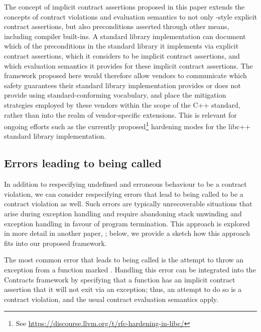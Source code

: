 The concept of implicit contract assertions proposed in this paper extends the concepts of contract violations and evaluation semantics to not only \cite{P2900R7}-style explicit contract assertions, but also preconditions asserted through other means, including compiler built-ins. A standard library implementation can document which of the preconditions in the standard library it implements via explicit contract assertions, which it considers to be implicit contract assertions, and which evaluation semantics it provides for these implicit contract assertions. The framework proposed here would therefore allow vendors to communicate which safety guarantees their standard library implementation provides or does not provide using standard-conforming vocabulary, and place the mitigation strategies employed by these vendors within the scope of the C++ standard, rather than into the realm of vendor-specific extensions. This is relevant for ongoing efforts such as the currently proposed\footnote{See \url{https://discourse.llvm.org/t/rfc-hardening-in-libc/}} hardening modes for the libc++ standard library implementation.

\subsection{Errors leading to  being called}

In addition to respecifying undefined and erroneous behaviour to be a contract violation, we can consider respecifying errors that lead to  being called to be a contract violation as well. Such errors are typically unrecoverable situations that arise during exception handling and require abandoning stack unwinding and exception handling in favour of program termination. This approach is explored in more detail in another paper, \cite{P3205R0}; below, we provide a sketch how this approach fits into our proposed framework.

The most common error that leads to  being called is the attempt to throw an exception from a function marked . Handling this error can be integrated into the Contracts framework by specifying that a  function has an implicit contract assertion that it will not exit via an exception; thus, an attempt to do so is a contract violation, and the usual contract evaluation semantics apply.

